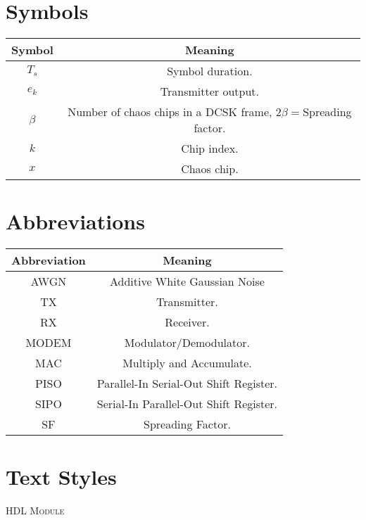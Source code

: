 \section*{Symbols}
\begin{center}
    \begin{tabular}{c c}
        \hline
        Symbol & Meaning\\
        \hline
        $T_s$ & Symbol duration.\\
        $e_k$ & Transmitter output.\\
        $\beta$ & Number of chaos chips in a DCSK frame, $2\beta = $Spreading factor.\\
        $k$ & Chip index.\\
        $x$ & Chaos chip.\\
        \hline
    \end{tabular}
\end{center}

\section*{Abbreviations}
\begin{center}
    \begin{tabular}{c c}
        \hline
        Abbreviation & Meaning\\
        \hline
        AWGN & Additive White Gaussian Noise\\
        TX & Transmitter.\\
        RX & Receiver.\\
        MODEM & Modulator/Demodulator.\\
        MAC & Multiply and Accumulate.\\
        PISO & Parallel-In Serial-Out Shift Register.\\
        SIPO & Serial-In Parallel-Out Shift Register.\\
        SF & Spreading Factor.\\
        \hline
    \end{tabular}
\end{center}

\section*{Text Styles}
\textsc{HDL Module}
